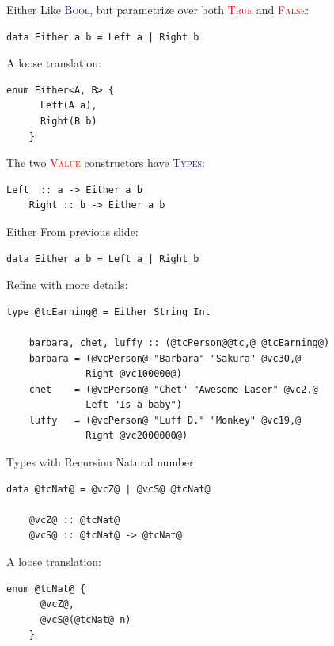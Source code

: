 \documentclass[xcolor={usenames,dvipsnames}]{beamer}
\newcommand{\htycon}[1]{\textcolor{MidnightBlue}{\textsc{#1}}}
\newcommand{\hvalcon}[1]{\textcolor{Red}{\textsc{#1}}}
\begin{document}
\begin{frame}[fragile]{Either}
  Like \htycon{Bool}, but parametrize over both \hvalcon{True} and \hvalcon{False}:
  \begin{lstlisting}[style=hask]
    data Either a b = Left a | Right b
  \end{lstlisting}

  \pause
  A loose translation:
  \begin{lstlisting}[style=hask]
    enum Either<A, B> {
      Left(A a),
      Right(B b)
    }
  \end{lstlisting}

  \pause
  The two \hvalcon{Value} constructors have \htycon{Types}:
  \begin{lstlisting}[style=hask]
    Left  :: a -> Either a b
    Right :: b -> Either a b
  \end{lstlisting}
\end{frame}

\begin{frame}[fragile]{Either}
  From previous slide:
  \begin{lstlisting}[style=hask]
    data Either a b = Left a | Right b
  \end{lstlisting}

  \pause
  Refine with more details:
  \begin{lstlisting}[style=hask]
    type @tcEarning@ = Either String Int

    barbara, chet, luffy :: (@tcPerson@@tc,@ @tcEarning@)
    barbara = (@vcPerson@ "Barbara" "Sakura" @vc30,@
              Right @vc100000@)
    chet    = (@vcPerson@ "Chet" "Awesome-Laser" @vc2,@
              Left "Is a baby") 
    luffy   = (@vcPerson@ "Luff D." "Monkey" @vc19,@
              Right @vc2000000@)
  \end{lstlisting}
\end{frame}

\begin{frame}[fragile]{Types with Recursion}
  Natural number:
  \begin{lstlisting}[style=hask]
    data @tcNat@ = @vcZ@ | @vcS@ @tcNat@

    @vcZ@ :: @tcNat@
    @vcS@ :: @tcNat@ -> @tcNat@
  \end{lstlisting}

  \pause
  A loose translation:
  \begin{lstlisting}[style=hask]
    enum @tcNat@ {
      @vcZ@,
      @vcS@(@tcNat@ n)
    }
  \end{lstlisting}
\end{frame}
\end{document}
